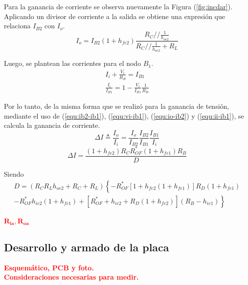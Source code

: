 Para la ganancia de corriente se observa nuevamente la Figura (\ref{fig:incdar}). Aplicando un divisor de corriente a la salida se obtiene una expresión que relaciona $I_{B2}$ con $I_o$.
\begin{equation}
	I_o = I_{B2} \left( 1 + h_{fe2} \right) \frac{R_C // \frac{1}{h_{oe2}}}{R_C // \frac{1}{h_{oe2}} + R_L}
	\label{equ:io-ib2}
\end{equation}

Luego, se plantean las corrientes para el nodo $B_1$.
\begin{equation}
\begin{split}
	I_i + \frac{V_i}{R_B} = I_{B1}	\\
	\frac{I_i}{I_{B1}} = 1 - \frac{V_i}{I_{B1}} \frac{1}{R_B}
\end{split}
\label{equ:ii-ib1}
\end{equation}

Por lo tanto, de la misma forma que se realizó para la ganancia de tensión, mediante el uso de (\ref{equ:ib2-ib1}), (\ref{equ:vi-ib1}), (\ref{equ:io-ib2}) y (\ref{equ:ii-ib1}), se calcula la ganancia de corriente.
\begin{equation*}
	\Delta I \triangleq \frac{I_o}{I_i} = \frac{I_o}{I_{B2}} \frac{I_{B2}}{I_{B1}} \frac{I_{B1}}{I_i}
\end{equation*}
\begin{equation}
	\Delta I = \frac { \left( 1+h_{fe2} \right) R_C R_{OF}^* \left( 1+h_{fe1} \right) R_B}{D}
\end{equation}

Siendo
\begin{equation}
\begin{split}
D = \left( R_C R_L  h_{oe2}+R_C+R_L \right) \left\lbrace -R_{OF}^*  \left[ 1+h_{fe2} \left( 1+h_{fe1} \right) \right] R_D \left( 1+h_{fe1} \right) \right. \\
 \left. - R_{OF}^* h_{ie2} \left( 1+h_{fe1} \right) + \left[ R_{OF}^*+h_{ie2}+R_D \left( 1+h_{fe2} \right)  \right] \left( R_B-h_{ie1} \right) \right\rbrace
\end{split}
\end{equation}

\begin{center}
	\LARGE{\textcolor{red}{$\mathbf{R_{ia}, R_{oa}}$}}
\end{center}

\subsection{Desarrollo y armado de la placa}
\begin{center}
	\LARGE{\textcolor{red}{\textbf{Esquemático, PCB y foto.}}}\\
	\LARGE{\textcolor{red}{\textbf{Consideraciones necesarias para medir.}}}
\end{center}

